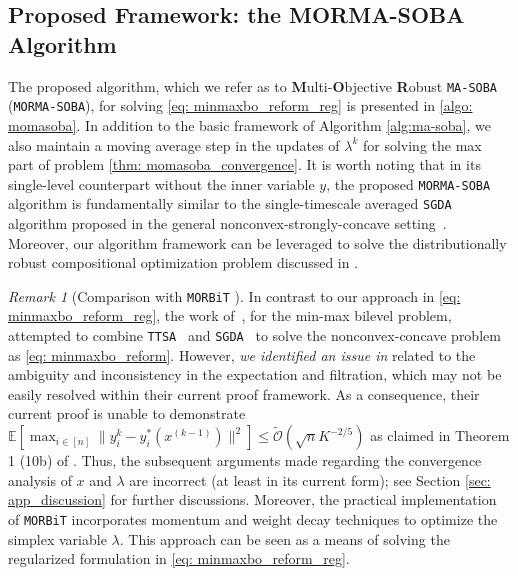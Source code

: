 \documentclass[10pt]{article}
\theoremstyle{remark}
\newtheorem*{remark}{Remark}
\newcommand{\cO}{\mathcal{O}}
\newcommand{\E}{\mathbb{E}}
\begin{document}
\subsection{Proposed Framework: the MORMA-SOBA Algorithm}
The proposed algorithm, which we refer as to \textbf{M}ulti-\textbf{O}bjective \textbf{R}obust \texttt{MA-SOBA} (\texttt{MORMA-SOBA}), for solving \eqref{eq: minmaxbo_reform_reg} is presented in \ref{algo: momasoba}. In addition to the basic framework of Algorithm \ref{alg:ma-soba}, we also maintain a moving average step in the updates of $\lambda^k$ for solving the max part of problem \ref{thm: momasoba_convergence}. It is worth noting that in its single-level counterpart without the inner variable $y$, the proposed \texttt{MORMA-SOBA} algorithm is fundamentally similar to the single-timescale averaged \texttt{SGDA} algorithm proposed in the general nonconvex-strongly-concave setting~\cite{qiu2020single}. Moreover, our algorithm framework can be leveraged to solve the distributionally robust compositional optimization problem discussed in \cite{gao2021convergence}.
\begin{remark}[Comparison with \texttt{MORBiT} \cite{gu2022min}]
    In contrast to our approach in \eqref{eq: minmaxbo_reform_reg}, the work of~\cite{gu2022min}, for the min-max bilevel problem, attempted to combine \texttt{TTSA}~\cite{hong2023two} and \texttt{SGDA}~\cite{lin2020gradient} to solve the nonconvex-concave problem as \eqref{eq: minmaxbo_reform}. However, \textit{we identified an issue in} \cite{gu2022min} related to the ambiguity and inconsistency in the expectation and filtration, which may not be easily resolved within their current proof framework. As a consequence, their current proof is unable to demonstrate $\E[\max_{i\in [n]}\|y_i^{k} - y_i^*(x^{(k-1)})\|^2 ]\leq \tilde{\cO}(\sqrt{n}K^{-2/5})$ as claimed in Theorem 1 (10b) of \cite{gu2022min}. Thus, the subsequent arguments made regarding the convergence analysis of $x$ and $\lambda$ are incorrect (at least in its current form); see Section \ref{sec: app_discussion} for further discussions. Moreover, the practical implementation of \texttt{MORBiT} incorporates momentum and weight decay techniques to optimize the simplex variable $\lambda$. This approach can be seen as a means of solving the regularized formulation in \eqref{eq: minmaxbo_reform_reg}.
\end{remark}
\end{document}
